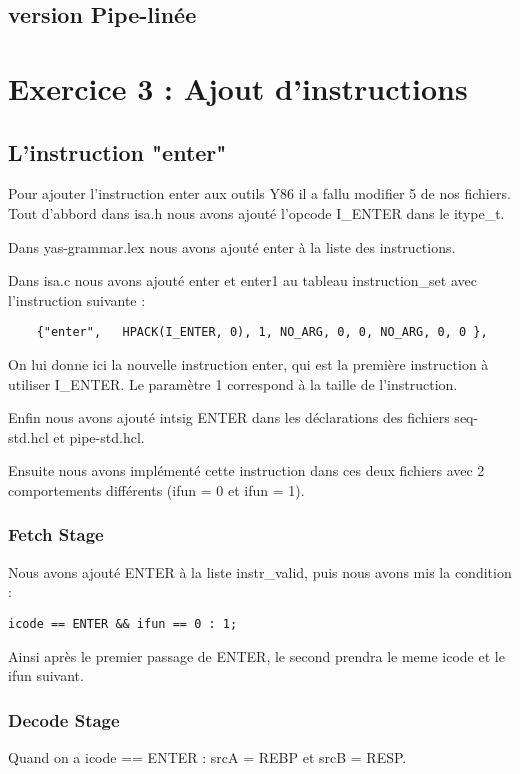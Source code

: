 \documentclass[12pt]{article}
\begin{document}
\subsection{version Pipe-linée}

\newpage
\section{Exercice 3 : Ajout d'instructions}
\subsection{L'instruction "enter"}
Pour ajouter l'instruction enter aux outils Y86 il a fallu modifier 5 de nos fichiers.
Tout d'abbord dans isa.h nous avons ajouté l'opcode I\_ENTER dans le itype\_t.

Dans yas-grammar.lex nous avons ajouté enter à la liste des instructions.

Dans isa.c nous avons ajouté enter et enter1 au tableau instruction\_set avec l'instruction suivante :
\begin{verbatim}
    {"enter",   HPACK(I_ENTER, 0), 1, NO_ARG, 0, 0, NO_ARG, 0, 0 },

\end{verbatim}

On lui donne ici la nouvelle instruction enter, qui est la première instruction à utiliser I\_ENTER. Le paramètre 1 correspond à la taille de l'instruction.

Enfin nous avons ajouté intsig ENTER dans les déclarations des fichiers seq-std.hcl et pipe-std.hcl.

Ensuite nous avons implémenté cette instruction dans ces deux fichiers avec 2 comportements différents (ifun = 0 et ifun = 1).

\subsubsection{Fetch Stage}
Nous avons ajouté ENTER à la liste instr\_valid, puis nous avons mis la condition : 
\begin{verbatim}
icode == ENTER && ifun == 0 : 1;
\end{verbatim}

Ainsi après le premier passage de ENTER, le second prendra le meme icode et le ifun suivant.

\subsubsection{Decode Stage}
Quand on a icode == ENTER : srcA = REBP et srcB = RESP.
\end{document}
